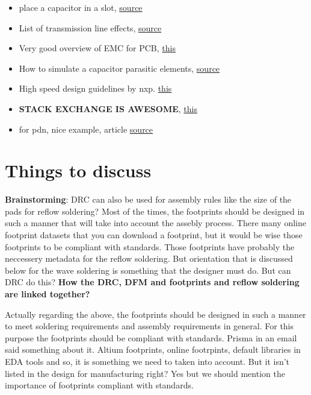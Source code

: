 \documentclass[12pt]{article}
\begin{document}
\begin{itemize}
	\item place a capacitor in a slot, \href{https://ieeexplore.ieee.org/document/801393}{source}
	
	\item List of transmission line effects, \href{https://www.pcbway.com/blog/Engineering_Technical/PCB_circuit_design_transmission_line_effects.html}{source}
	\item Very good overview of EMC for PCB, \href{https://electronics.stackexchange.com/questions/81761/whats-radiating-on-my-pcb}{this}
	\item How to simulate a capacitor parasitic elements, \href{https://incompliancemag.com/article/impact-of-a-trace-length-on-capacitor-frequency-response/}{source}
	\item High speed design guidelines by nxp. \href{https://www.nxp.com/docs/en/application-note/AN2536.pdf}{this}
	\item \textbf{STACK EXCHANGE IS AWESOME}, \href{https://electronics.stackexchange.com/questions/15135/decoupling-caps-pcb-layout/15143#15143}{this}
	\item for pdn, nice example, article \href{https://benthamopen.com/contents/pdf/TOOPTSJ/TOOPTSJ-5-51.pdf}{source}
\end{itemize}

\section{Things to discuss}

\textbf{Brainstorming}: DRC can also be used for assembly rules like the size of the pads for reflow soldering? Most of the times, the footprints should be designed in such a manner that will take into account the assebly process. There many online footprint datasets that you can download a footprint, but it would be wise those footprints to be compliant with standards. Those footprints have probably the neccessery metadata for the reflow soldering. But orientation that is discussed below for the wave soldering is something that the designer must do. But can DRC do this? \textbf{How the DRC, DFM and footprints and reflow soldering are linked together?}

Actually regarding the above, the footprints should be designed in such a manner to meet soldering requirements and assembly requirements in general. For this purpose the footprints should be compliant with standards. Prisma in an email said something about it. Altium footprints, online footrpints, default libraries in EDA tools and so, it is something we need to taken into account. But it isn't listed in the design for manufacturing right? Yes but we should mention the importance of footprints compliant with standards.
\end{document}
